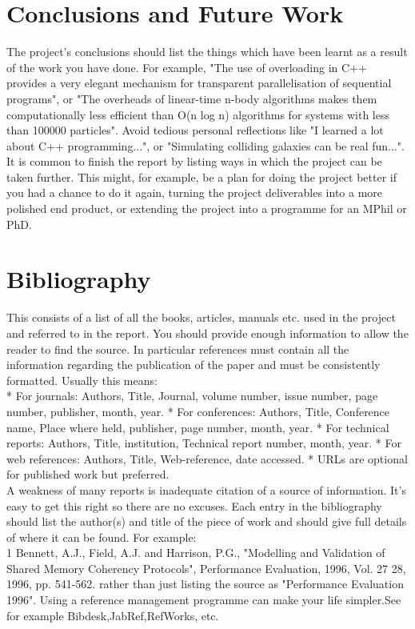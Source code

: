 \documentclass[12pt,twoside]{article}
\begin{document}
\newpage

\section{Conclusions and Future Work}
The project's conclusions should list the things which have been learnt as a result of the work you have done. For example, "The use of overloading in C++ provides a very elegant mechanism for transparent parallelisation of sequential programs", or "The overheads of linear-time n-body algorithms makes them computationally less efficient than O(n log n) algorithms for systems with less than 100000 particles". Avoid tedious personal reflections like "I learned a lot about C++ programming...", or "Simulating colliding galaxies can be real fun...". It is common to finish the report by listing ways in which the project can be taken further. This might, for example, be a plan for doing the project better if you had a chance to do it again, turning the project deliverables into a more polished end product, or extending the project into a programme for an MPhil or PhD.\\


\newpage

\section{Bibliography}
This consists of a list of all the books, articles, manuals etc. used in the project and referred to in the report. You should provide enough information to allow the reader to find the source. In particular references must contain all the information regarding the publication of the paper and must be consistently formatted. Usually this means:\\
* For journals: Authors, Title, Journal, volume number, issue number, page number, publisher, month, year.
* For conferences: Authors, Title, Conference name, Place where held, publisher, page number, month, year.
* For technical reports: Authors, Title, institution, Technical report number, month, year.
* For web references: Authors, Title, Web-reference, date accessed.
* URLs are optional for published work but preferred.\\
A weakness of many reports is inadequate citation of a source of information. It's easy to get this right so there are no excuses. Each entry in the bibliography should list the author(s) and title of the piece of work and should give full details of where it can be found. For example:\\
1 Bennett, A.J., Field, A.J. and Harrison, P.G., "Modelling and Validation of Shared Memory Coherency Protocols", Performance Evaluation, 1996, Vol. 27  28, 1996, pp. 541-562. rather than just listing the source as "Performance Evaluation 1996".
Using a reference management programme can make your life simpler.See for example Bibdesk,JabRef,RefWorks, etc.\\
\end{document}
